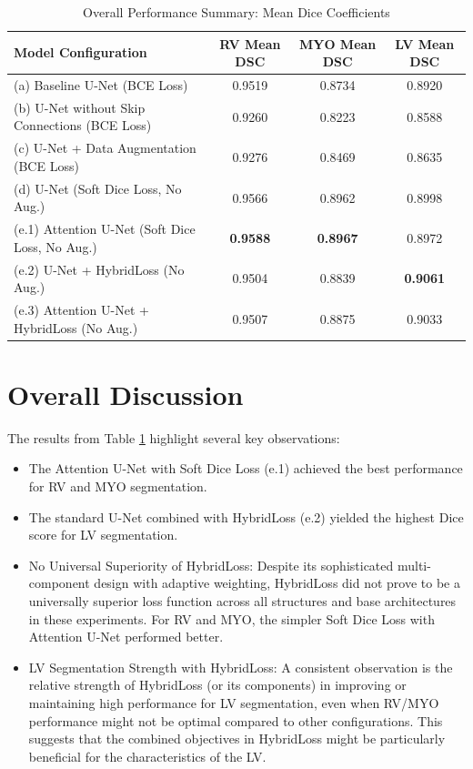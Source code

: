 \documentclass{article}
\begin{document}
\begin{table}[H]
  \centering
  \caption{Overall Performance Summary: Mean Dice Coefficients}
  \label{tab:overall_summary}
  \begin{tabular}{lccc}
    \toprule
    Model Configuration                             & RV Mean DSC     & MYO Mean DSC    & LV Mean DSC     \\
    \midrule
    (a) Baseline U-Net (BCE Loss)                   & 0.9519          & 0.8734          & 0.8920          \\
    (b) U-Net without Skip Connections (BCE Loss)   & 0.9260          & 0.8223          & 0.8588          \\
    (c) U-Net + Data Augmentation (BCE Loss)        & 0.9276          & 0.8469          & 0.8635          \\
    (d) U-Net (Soft Dice Loss, No Aug.)             & 0.9566          & 0.8962          & 0.8998          \\
    (e.1) Attention U-Net (Soft Dice Loss, No Aug.) & \textbf{0.9588} & \textbf{0.8967} & 0.8972          \\
    (e.2) U-Net + HybridLoss (No Aug.)              & 0.9504          & 0.8839          & \textbf{0.9061} \\
    (e.3) Attention U-Net + HybridLoss (No Aug.)    & 0.9507          & 0.8875          & 0.9033          \\
    \bottomrule
  \end{tabular}
\end{table}

\section{Overall Discussion}
The results from Table \ref{tab:overall_summary} highlight several key observations:
\begin{itemize}
  \item The Attention U-Net with Soft Dice Loss (e.1) achieved the best performance for RV and MYO segmentation.
  \item The standard U-Net combined with HybridLoss (e.2) yielded the highest Dice score for LV segmentation.
  \item No Universal Superiority of HybridLoss: Despite its sophisticated multi-component design with adaptive weighting, HybridLoss did not prove to be a universally superior loss function across all structures and base architectures in these experiments. For RV and MYO, the simpler Soft Dice Loss with Attention U-Net performed better.
  \item LV Segmentation Strength with HybridLoss: A consistent observation is the relative strength of HybridLoss (or its components) in improving or maintaining high performance for LV segmentation, even when RV/MYO performance might not be optimal compared to other configurations. This suggests that the combined objectives in HybridLoss might be particularly beneficial for the characteristics of the LV.
\end{itemize}
\end{document}
